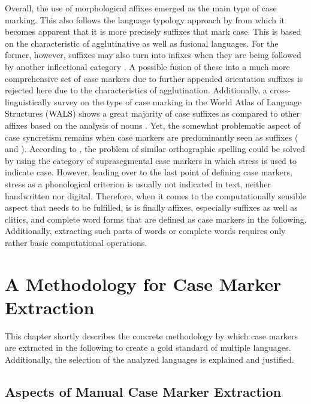 \documentclass[11pt,a4paper,twoside,openright]{scrbook}
\begin{document}
Overall, the use of morphological affixes emerged as the main type of  case marking. This also follows the language typology approach by \citet{comrie1989typol} from which it becomes apparent that it is more precisely suffixes that mark case. This is based on the characteristic of agglutinative as well as fusional languages. For the former, however, suffixes may also turn into infixes when they are being followed by another inflectional category \citep{blake2012hbocas}. A possible fusion of these into a much more comprehensive set of case markers due to further appended orientation suffixes is rejected here due to the characteristics of agglutination. Additionally, a cross-linguistically survey on the type of case marking in the World Atlas of Language Structures (WALS) shows a great majority of case suffixes as compared to other affixes based on the analysis of nouns \citep{dryerwals51}. Yet, the somewhat problematic aspect of case syncretism remains when case markers are predominantly seen as suffixes (\citet{baerman2012hbocas} and \citet{blake1994case}). According to \citet{moravcsik2012hbocas}, the problem of similar orthographic spelling could be solved by using the category of suprasegmental case markers in which stress is used to indicate case. However, leading over to the last point of defining case markers, stress as a phonological criterion is usually not indicated in text, neither handwritten nor digital. Therefore, when it comes to the computationally sensible aspect that needs to be fulfilled, is is finally affixes, especially suffixes as well as clitics, and complete word forms that are defined as case markers in the following. Additionally, extracting such parts of words or complete words requires only rather basic computational operations.





\chapter{A Methodology for Case Marker Extraction}

This chapter shortly describes the concrete methodology by which case markers are extracted in the following to create a gold standard of multiple languages. Additionally, the selection of the analyzed languages is explained and justified.



\section{Aspects of Manual Case Marker Extraction}
\end{document}
